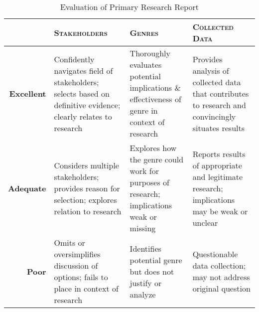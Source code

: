 \documentclass[10pt,oneside]{amsart}	%
\begin{document}
\begin{table}[b]
	\caption{Evaluation of Primary Research Report}\label{tab:rubric}
\begin{tabulary}{\textwidth}{rLLL}
	\toprule  & \textbf{\textsc{Stakeholders}} 
	& \textbf{\textsc{Genres}}
	& \textbf{\textsc{Collected Data}}
	\\
\midrule	\textbf{Excellent} 
& Confidently navigates field of stakeholders; selects based on definitive evidence; clearly relates to research 
& Thoroughly evaluates potential implications \& effectiveness of genre in context of research
& Provides analysis of collected data that contributes to research and convincingly situates results
\\
\midrule	\textbf{Adequate} 
& Considers multiple stakeholders; provides reason for selection; explores relation to research 
& Explores how the genre could work for purposes of research; implications weak or missing
& Reports results of appropriate and legitimate research; implications may be weak or unclear
\\
\midrule	\textbf{Poor} 
& Omits or oversimplifies discussion of options; fails to place in context of research 
& Identifies potential genre but does not justify or analyze
& Questionable data collection; may not address original question
\\
	\bottomrule
\end{tabulary}
\end{table}

\end{document}
